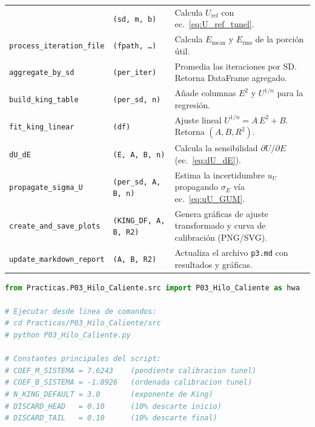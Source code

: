 \documentclass[12pt,a4paper]{article}
\begin{document}
\begin{table}[H]
\begin{tabularx}{\textwidth}{l l X}
		                 & \texttt{(sd, m, b)}           & Calcula $U_\mathrm{ref}$ con
		ec.~\eqref{eq:U_ref_tunel}.                                                                      \\
		\texttt{process\_iteration\_file}
		                 & \texttt{(fpath, \ldots)}      & Calcula $E_\mathrm{mean}$ y
		$E_\mathrm{rms}$ de la porción útil.                                                             \\
		\texttt{aggregate\_by\_sd}
		                 & \texttt{(per\_iter)}          & Promedia las iteraciones por SD.
		Retorna DataFrame agregado.                                                                      \\
		\texttt{build\_king\_table}
		                 & \texttt{(per\_sd, n)}         & Añade columnas $E^2$ y
		$U^{1/n}$ para la regresión.                                                                     \\
		\texttt{fit\_king\_linear}
		                 & \texttt{(df)}                 & Ajuste lineal $U^{1/n} = A\,E^2 + B$.
		Retorna $(A, B, R^2)$.                                                                           \\
		\texttt{dU\_dE}
		                 & \texttt{(E, A, B, n)}         & Calcula la sensibilidad
		$\partial U/\partial E$ (ec.~\eqref{eq:dU_dE}).                                                  \\
		\texttt{propagate\_sigma\_U}
		                 & \texttt{(per\_sd, A, B, n)}   & Estima la incertidumbre $u_U$
		propagando $\sigma_E$ vía ec.~\eqref{eq:uU_GUM}.                                                 \\
		\texttt{create\_and\_save\_plots}
		                 & \texttt{(KING\_DF, A, B, R2)} & Genera gráficas de ajuste
		transformado y curva de calibración (PNG/SVG).                                                   \\
		\texttt{update\_markdown\_report}
		                 & \texttt{(A, B, R2)}           & Actualiza el archivo \texttt{p3.md}
		con resultados y gráficas.                                                                       \\
		\bottomrule
	\end{tabularx}
\end{table}

\begin{lstlisting}[language=Python,caption={Uso básico del script de
  análisis HWA.}]
from Practicas.P03_Hilo_Caliente.src import P03_Hilo_Caliente as hwa

# Ejecutar desde linea de comandos:
# cd Practicas/P03_Hilo_Caliente/src
# python P03_Hilo_Caliente.py

# Constantes principales del script:
# COEF_M_SISTEMA = 7.6243    (pendiente calibracion tunel)
# COEF_B_SISTEMA = -1.8926   (ordenada calibracion tunel)
# N_KING_DEFAULT = 3.0       (exponente de King)
# DISCARD_HEAD   = 0.10      (10% descarte inicio)
# DISCARD_TAIL   = 0.10      (10% descarte final)
\end{lstlisting}
\end{document}
